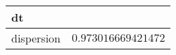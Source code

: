 \begin{table}[!tbp]
\begin{center}
\begin{tabular}{lr}
\hline\hline
\multicolumn{1}{l}{dt}&\multicolumn{1}{c}{}\tabularnewline
\hline
dispersion&$0.973016669421472$\tabularnewline
\hline
\end{tabular}\end{center}
\end{table}
